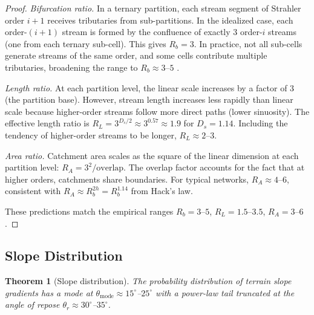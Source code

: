 \documentclass[10pt,twocolumn]{article}
\newtheorem{theorem}{Theorem}[section]
\theoremstyle{definition}
\theoremstyle{remark}
\begin{document}
\begin{proof}
\emph{Bifurcation ratio.}
In a ternary partition, each stream segment of Strahler order
$i+1$ receives tributaries from sub-partitions.  In the
idealized case, each order-$(i+1)$ stream is formed by the
confluence of exactly $3$ order-$i$ streams (one from each
ternary sub-cell).  This gives $R_b=3$.  In practice,
not all sub-cells generate streams of the same order, and
some cells contribute multiple tributaries, broadening the
range to $R_b\approx 3$--$5$
\citep{Horton1945,Strahler1957}.

\emph{Length ratio.}
At each partition level, the linear scale increases by a factor
of $3$ (the partition base).  However, stream length increases
less rapidly than linear scale because higher-order streams
follow more direct paths (lower sinuosity).  The effective
length ratio is $R_L = 3^{D_s/2}\approx 3^{0.57}\approx 1.9$
for $D_s=1.14$.  Including the tendency of higher-order streams
to be longer, $R_L\approx 2$--$3$.

\emph{Area ratio.}
Catchment area scales as the square of the linear dimension at
each partition level: $R_A = 3^2/\text{overlap}$.  The overlap
factor accounts for the fact that at higher orders, catchments
share boundaries.  For typical networks,
$R_A\approx 4$--$6$, consistent with $R_A\approx R_b^{2h}
= R_b^{1.14}$ from Hack's law.

These predictions match the empirical ranges
$R_b=3$--$5$, $R_L=1.5$--$3.5$, $R_A=3$--$6$
\citep{Horton1945,Strahler1957,RodriguezIturbe1997}.
\end{proof}

\subsection{Slope Distribution}\label{sec:slope}

\begin{theorem}[Slope distribution]\label{thm:slope}
The probability distribution of terrain slope gradients has a
mode at $\theta_{\mathrm{mode}}\approx 15^\circ$--$25^\circ$
with a power-law tail truncated at the angle of repose
$\theta_r\approx 30^\circ$--$35^\circ$.
\end{theorem}
\end{document}
